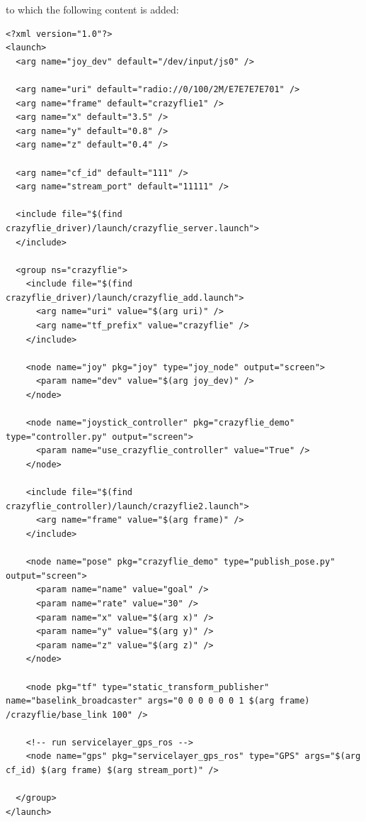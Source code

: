 \noindent to which the following content is added:
\begin{code}
\begin{verbatim}
<?xml version="1.0"?>
<launch>
  <arg name="joy_dev" default="/dev/input/js0" />

  <arg name="uri" default="radio://0/100/2M/E7E7E7E701" />
  <arg name="frame" default="crazyflie1" />
  <arg name="x" default="3.5" />
  <arg name="y" default="0.8" />
  <arg name="z" default="0.4" />
  
  <arg name="cf_id" default="111" />
  <arg name="stream_port" default="11111" />

  <include file="$(find crazyflie_driver)/launch/crazyflie_server.launch">
  </include>

  <group ns="crazyflie">
    <include file="$(find crazyflie_driver)/launch/crazyflie_add.launch">
      <arg name="uri" value="$(arg uri)" />
      <arg name="tf_prefix" value="crazyflie" />
    </include>

    <node name="joy" pkg="joy" type="joy_node" output="screen">
      <param name="dev" value="$(arg joy_dev)" />
    </node>

    <node name="joystick_controller" pkg="crazyflie_demo" type="controller.py" output="screen">
      <param name="use_crazyflie_controller" value="True" />
    </node>

    <include file="$(find crazyflie_controller)/launch/crazyflie2.launch">
      <arg name="frame" value="$(arg frame)" />
    </include>

    <node name="pose" pkg="crazyflie_demo" type="publish_pose.py" output="screen">
      <param name="name" value="goal" />
      <param name="rate" value="30" />
      <param name="x" value="$(arg x)" />
      <param name="y" value="$(arg y)" />
      <param name="z" value="$(arg z)" />
    </node>

    <node pkg="tf" type="static_transform_publisher" name="baselink_broadcaster" args="0 0 0 0 0 0 1 $(arg frame) /crazyflie/base_link 100" />
    
    <!-- run servicelayer_gps_ros -->
    <node name="gps" pkg="servicelayer_gps_ros" type="GPS" args="$(arg cf_id) $(arg frame) $(arg stream_port)" />
    
  </group>
</launch>

\end{verbatim}
\end{code}

